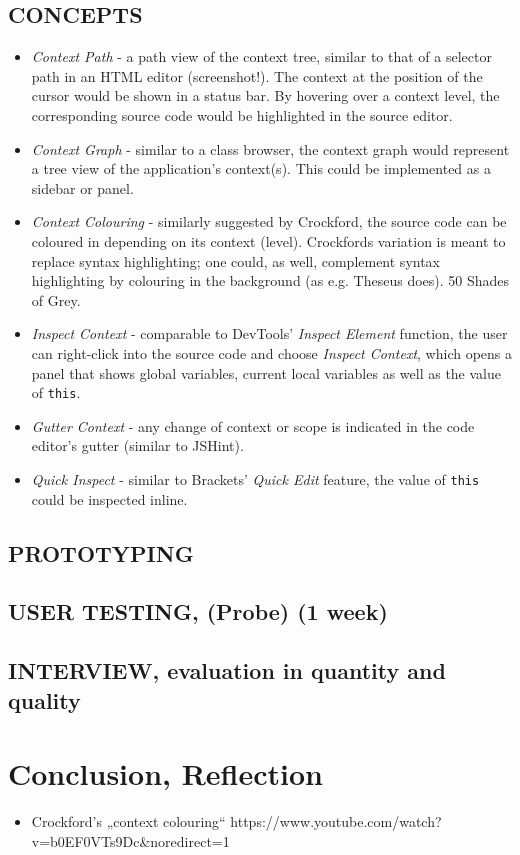 \subsection{CONCEPTS}\label{concepts}

\begin{itemize}
\itemsep1pt\parskip0pt
\item
  \emph{Context Path} - a path view of the context tree, similar to that
  of a selector path in an HTML editor (screenshot!). The context at the
  position of the cursor would be shown in a status bar. By hovering
  over a context level, the corresponding source code would be
  highlighted in the source editor.
\item
  \emph{Context Graph} - similar to a class browser, the context graph
  would represent a tree view of the application’s context(s). This
  could be implemented as a sidebar or panel.
\item
  \emph{Context Colouring} - similarly suggested by Crockford, the
  source code can be coloured in depending on its context (level).
  Crockfords variation is meant to replace syntax highlighting; one
  could, as well, complement syntax highlighting by colouring in the
  background (as e.g. Theseus does). 50 Shades of Grey.
\item
  \emph{Inspect Context} - comparable to DevTools’ \emph{Inspect
  Element} function, the user can right-click into the source code and
  choose \emph{Inspect Context}, which opens a panel that shows global
  variables, current local variables as well as the value of
  \texttt{this}.
\item
  \emph{Gutter Context} - any change of context or scope is indicated in
  the code editor’s gutter (similar to JSHint).
\item
  \emph{Quick Inspect} - similar to Brackets’ \emph{Quick Edit} feature,
  the value of \texttt{this} could be inspected inline.
\end{itemize}

\subsection{PROTOTYPING}\label{prototyping}

\subsection{USER TESTING, (Probe) (1
week)}\label{user-testing-probe-1-week}

\subsection{INTERVIEW, evaluation in quantity and
quality}\label{interview-evaluation-in-quantity-and-quality}

\section{Conclusion, Reflection}\label{conclusion-reflection}

\begin{itemize}
\itemsep1pt\parskip0pt
\item
  Crockford’s „context colouring“
  https://www.youtube.com/watch?v=b0EF0VTs9Dc\&noredirect=1
\end{itemize}
